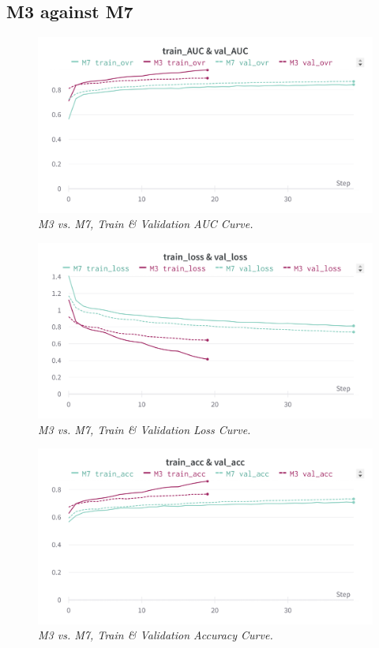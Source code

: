 \newpage

\subsection{M3 against M7}

\begin{figure}[H]
  \centering
  \includegraphics[width=\textwidth]{imatges/results/AUCM3M7.png}
  \caption[M3 vs. M7, Train \& Validation AUC Curve]{\textit{M3 vs. M7, Train \& Validation AUC Curve. }}
\end{figure}


\begin{figure}[H]
  \centering
  \includegraphics[width=\textwidth]{imatges/results/LossM3M7.png}
  \caption[M3 vs. M7, Train \& Validation Loss Curve]{\textit{M3 vs. M7, Train \& Validation Loss Curve. }}
\end{figure}

\newpage

\begin{figure}[H]
  \centering
  \includegraphics[width=\textwidth]{imatges/results/AccM3M7.png}
  \caption[M3 vs. M7, Train \& Validation Accuracy Curve]{\textit{M3 vs. M7, Train \& Validation Accuracy Curve. }}
\end{figure}


